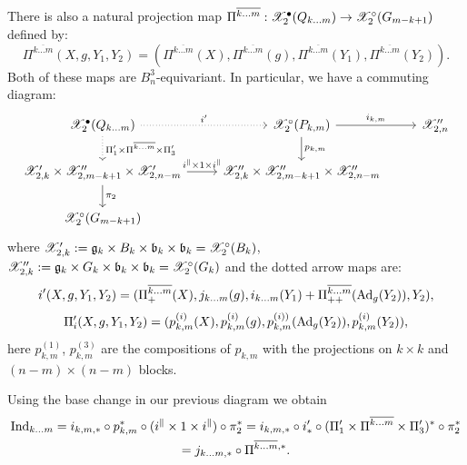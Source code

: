 There is also a natural projection map $\Pi^{\overline{k\dots m}}:\mathscr{X}^\bullet_2(Q_{k\dots m})\to \mathscr{X}_2^\circ(G_{m-k+1})$ defined by:
$$ \Pi^{\overline{k\dots m}}(X,g,Y_1,Y_2)=(\Pi^{\overline{k\dots m}}(X),\Pi^{\overline{k\dots m}}(g),\Pi^{\overline{k\dots m}}(Y_1),\Pi^{\overline{k\dots m}}(Y_2)).$$
Both of these maps are $B_n^3$-equivariant. In particular, we have a commuting diagram:
  \[ \begin{tikzcd}
 \calX_2^{\bullet}(Q_{k\dots m}) \arrow[dotted]{r}{i'}\arrow[dotted]{d}{\Pi'_1\times\Pi^{\overline{k\dots m}}\times\Pi'_3}   & \calX^\circ_2(P_{k,m})\arrow{d}{p_{k,m}}\arrow{r}{i_{k,m}}&\calX''_{2,n}\\
 \calX'_{2,k}\times \calX''_{2,m-k+1}\times \calX'_{2,n-m} \arrow{r}{i^{\parallel}\times 1\times i^{\parallel}}\arrow{d}{\pi_2} &
 \calX''_{2,k}\times\calX''_{2,m-k+1}\times \calX''_{2,n-m}&\\
\calX^\circ_2(G_{m-k+1})&&
\end{tikzcd}\]
where \(\mathscr{X}'_{2,k}:=\mathfrak{g}_k\times B_k\times \mathfrak{b}_k\times \mathfrak{b}_k=\mathscr{X}^{\circ}_2(B_k)\), \(\mathscr{X}''_{2,k}:=\mathfrak{g}_k\times G_k\times \mathfrak{b}_k\times\mathfrak{b}_k=\mathscr{X}^{\circ}_2(G_k)\)
and the dotted arrow maps are:
\[i'(X,g,Y_1,Y_2)=(\Pi^{\overline{k\dots m}}_+(X),j_{k\dots m}(g),i_{k\dots m}(Y_1)+
  \Pi^{\overline{k\dots m}}_{++}({\rm Ad}_g(Y_2)),Y_2),\]
\[\Pi'_i(X,g,Y_1,Y_2)=(p_{k,m}^{(i)}(X),p_{k,m}^{(i)}(g),p_{k,m}^{(i))}({\rm Ad}_g(Y_2)),p_{k,m}^{(i)}(Y_2)),\]
here \(p_{k,m}^{(1)}\), \(p_{k,m}^{(3)}\) are the compositions of \(p_{k,m}\) with the projections on \(k\times k\) and \((n-m)\times(n-m)\) blocks.

Using the base change in our previous diagram we obtain
\begin{multline*}
\mathrm{Ind}_{k\dots m}=i_{k,m,*}\circ p_{k,m}^*\circ (i^{\parallel}\times 1\times i^{\parallel})\circ \pi_2^*=i_{k,m,*}\circ i'_*\circ (\Pi'_1\times\Pi^{\overline{k\dots m}}\times\Pi'_3)^*\circ\pi_2^*\\=
j_{k\dots m,*}\circ \Pi^{\overline{k\dots m},*}.
\end{multline*}

